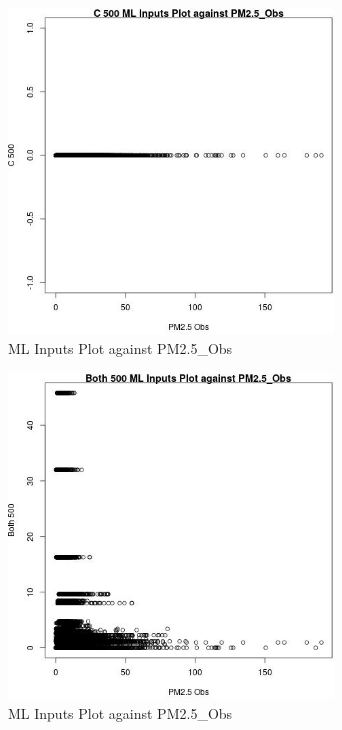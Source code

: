 \begin{figure} 
\centering  
\includegraphics[width=0.77\textwidth]{Code_Outputs/Report_ML_input_PM25_Step4_part_e_de_duplicated_aves_C_500vPM25_Obs.jpg} 
\caption{\label{fig:Report_ML_input_PM25_Step4_part_e_de_duplicated_avesC_500vPM25_Obs}ML Inputs Plot against PM2.5_Obs} 
\end{figure} 
 

\begin{figure} 
\centering  
\includegraphics[width=0.77\textwidth]{Code_Outputs/Report_ML_input_PM25_Step4_part_e_de_duplicated_aves_Both_500vPM25_Obs.jpg} 
\caption{\label{fig:Report_ML_input_PM25_Step4_part_e_de_duplicated_avesBoth_500vPM25_Obs}ML Inputs Plot against PM2.5_Obs} 
\end{figure} 
 


